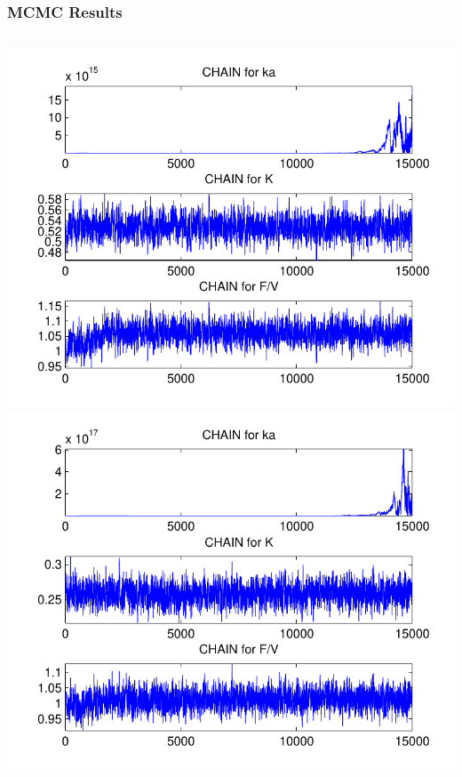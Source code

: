\documentclass[t]{beamer}
\begin{document}
\begin{frame}[t]
  \frametitle{MCMC Results}
  \begin{columns}
  \includegraphics[width=.85\textwidth]{mice_b_chains.pdf} \\
  \includegraphics[width=.85\textwidth]{mice_a_chains.pdf}


\end{columns}
\end{frame}
\end{document}
